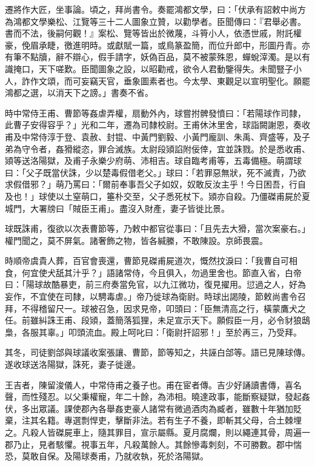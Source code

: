 \begin{pinyinscope}
遷將作大匠，坐事論。頃之，拜尚書令。奏罷鴻都文學，曰：「伏承有詔敕中尚方為鴻都文學樂松、江覽等三十二人圖象立贊，以勸學者。臣聞傳曰：『君舉必書。書而不法，後嗣何觀！』案松、覽等皆出於微蔑，斗筲小人，依憑世戚，附託權豪，俛眉承睫，徼進明時。或獻賦一篇，或鳥篆盈簡，而位升郎中，形圖丹青。亦有筆不點牘，辭不辯心，假手請字，妖偽百品，莫不被蒙殊恩，蟬蛻滓濁。是以有識掩口，天下嗟歎。臣聞圖象之設，以昭勸戒，欲令人君動鑒得失。未聞豎子小人，詐作文頌，而可妄竊天官，垂象圖素者也。今太學、東觀足以宣明聖化。願罷鴻都之選，以消天下之謗。」書奏不省。

時中常侍王甫、曹節等姦虐弄權，扇動外內，球嘗拊髀發憤曰：「若陽球作司隸，此曹子安得容乎？」光和二年，遷為司隸校尉。王甫休沐里舍，球詣闕謝恩，奏收甫及中常侍淳于登、袁赦、封锟、中黃門劉毅、小黃門龐訓、朱禹、齊盛等，及子弟為守令者，姦猾縱恣，罪合滅族。太尉段熲諂附佞倖，宜並誅戮。於是悉收甫、熲等送洛陽獄，及甫子永樂少府萌、沛相吉。球自臨考甫等，五毒備極。萌謂球曰：「父子既當伏誅，少以楚毒假借老父。」球曰：「若罪惡無狀，死不滅責，乃欲求假借邪？」萌乃罵曰：「爾前奉事吾父子如奴，奴敢反汝主乎！今日困吾，行自及也！」球使以土窒萌口，箠朴交至，父子悉死杖下。熲亦自殺。乃僵磔甫屍於夏城門，大署牓曰「賊臣王甫」。盡沒入財產，妻子皆徙比景。

球既誅甫，復欲以次表曹節等，乃敕中都官從事曰：「且先去大猾，當次案豪右。」權門聞之，莫不屏氣。諸奢飾之物，皆各緘縢，不敢陳設。京師畏震。

時順帝虞貴人葬，百官會喪還，曹節見磔甫屍道次，慨然抆淚曰：「我曹自可相食，何宜使犬舐其汁乎？」語諸常侍，今且俱入，勿過里舍也。節直入省，白帝曰：「陽球故酷暴吏，前三府奏當免官，以九江微功，復見擢用。愆過之人，好為妄作，不宜使在司隸，以騁毒虐。」帝乃徙球為衛尉。時球出謁陵，節敕尚書令召拜，不得稽留尺一。球被召急，因求見帝，叩頭曰：「臣無清高之行，橫蒙鷹犬之任。前雖糾誅王甫、段熲，蓋簡落狐狸，未足宣示天下。願假臣一月，必令豺狼鴟梟，各服其辜。」叩頭流血。殿上呵叱曰：「衛尉扞詔邪！」至於再三，乃受拜。

其冬，司徒劉郃與球議收案張讓、曹節，節等知之，共誣白郃等。語已見陳球傳。遂收球送洛陽獄，誅死，妻子徙邊。

王吉者，陳留浚儀人，中常侍甫之養子也。甫在宦者傳。吉少好誦讀書傳，喜名聲，而性殘忍。以父秉權寵，年二十餘，為沛相。曉達政事，能斷察疑獄，發起姦伏，多出眾議。課使郡內各舉姦吏豪人諸常有微過酒肉為臧者，雖數十年猶加貶棄，注其名籍。專選剽悍吏，擊斷非法。若有生子不養，即斬其父母，合土棘埋之。凡殺人皆磔屍車上，隨其罪目，宣示屬縣。夏月腐爛，則以繩連其骨，周遍一郡乃止，見者駭懼。視事五年，凡殺萬餘人。其餘慘毒刺刻，不可勝數。郡中惴恐，莫敢自保。及陽球奏甫，乃就收執，死於洛陽獄。


\end{pinyinscope}
